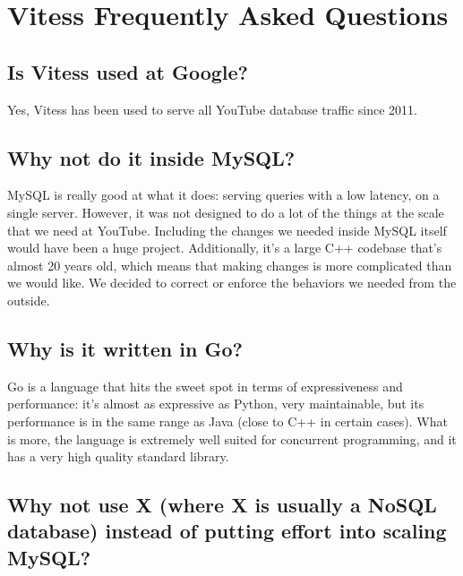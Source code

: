 \section{Vitess Frequently Asked Questions}\label{Vitess-FAQ}

\subsection{Is Vitess used at Google?}\hypertarget{is-vitess-used-at-google}{}\label{is-vitess-used-at-google}

Yes, Vitess has been used to serve all YouTube database traffic since
2011.

\subsection{Why not do it inside MySQL?}\hypertarget{why-not-do-it-inside-mysql}{}\label{why-not-do-it-inside-mysql}

MySQL is really good at what it does: serving queries with a low
latency, on a single server. However, it was not designed to do a lot
of the things at the scale that we need at YouTube. Including the
changes we needed inside MySQL itself would have been a huge
project. Additionally, it’s a large C++ codebase that’s almost 20
years old, which means that making changes is more complicated than we
would like. We decided to correct or enforce the behaviors we
needed from the outside.

\subsection{Why is it written in Go?}\hypertarget{why-is-it-written-in-go}{}\label{why-is-it-written-in-go}

Go is a language that hits the sweet spot in terms of expressiveness
and performance: it’s almost as expressive as Python, very
maintainable, but its performance is in the same range as Java (close
to C++ in certain cases). What is more, the language is extremely well
suited for concurrent programming, and it has a very high quality
standard library.

\subsection{Why not use X (where X is usually a NoSQL database) instead of putting effort into scaling MySQL?}\hypertarget{why-not-use-x-where-x-is-usually-a-nosql-database-instead-of-putting-effort-into-scaling-mysql}{}\label{why-not-use-x-where-x-is-usually-a-nosql-database-instead-of-putting-effort-into-scaling-mysql}

